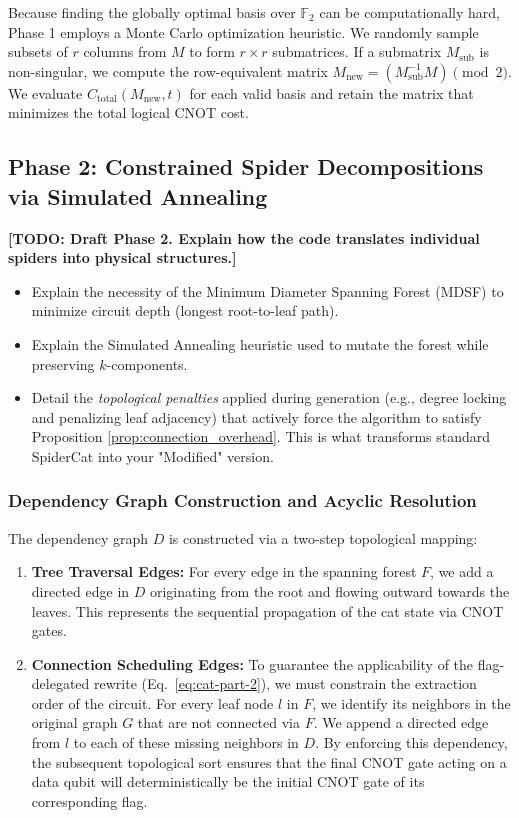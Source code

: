 \documentclass[11pt]{article}
\theoremstyle{definition}
\begin{document}
Because finding the globally optimal basis over $\mathbb{F}_2$ can be computationally hard, Phase 1 employs a Monte Carlo optimization heuristic.
We randomly sample subsets of $r$ columns from $M$ to form $r \times r$ submatrices.
If a submatrix $M_{\text{sub}}$ is non-singular, we compute the row-equivalent matrix $M_{\text{new}} = (M_{\text{sub}}^{-1} M) \pmod 2$.
We evaluate $C_{\text{total}}(M_{\text{new}}, t)$ for each valid basis and retain the matrix that minimizes the total logical CNOT cost.

\subsection{Phase 2: Constrained Spider Decompositions via Simulated Annealing}
\textbf{[TODO: Draft Phase 2. Explain how the code translates individual spiders into physical structures.]}
\begin{itemize}
    \item Explain the necessity of the Minimum Diameter Spanning Forest (MDSF) to minimize circuit depth (longest root-to-leaf path).
    \item Explain the Simulated Annealing heuristic used to mutate the forest while preserving $k$-components.
    \item Detail the \textit{topological penalties} applied during generation (e.g., degree locking and penalizing leaf adjacency) that actively force the algorithm to satisfy Proposition \ref{prop:connection_overhead}.
    This is what transforms standard SpiderCat into your "Modified" version.
\end{itemize}

\subsubsection*{Dependency Graph Construction and Acyclic Resolution}

The dependency graph $D$ is constructed via a two-step topological mapping:
\begin{enumerate}
    \item \textbf{Tree Traversal Edges:} For every edge in the spanning forest $F$, we add a directed edge in $D$ originating from the root and flowing outward towards the leaves. This represents the sequential propagation of the cat state via CNOT gates.
    \item \textbf{Connection Scheduling Edges:} To guarantee the applicability of the flag-delegated rewrite (Eq.~\ref{eq:cat-part-2}), we must constrain the extraction order of the circuit. For every leaf node $l$ in $F$, we identify its neighbors in the original graph $G$ that are not connected via $F$. We append a directed edge from $l$ to each of these missing neighbors in $D$. By enforcing this dependency, the subsequent topological sort ensures that the final CNOT gate acting on a data qubit will deterministically be the initial CNOT gate of its corresponding flag.
\end{enumerate}
\end{document}
